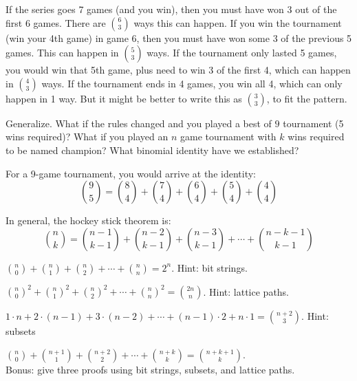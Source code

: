 \documentclass[11pt]{exam}
\def\d{\displaystyle}
\begin{document}
\begin{questions}
\begin{parts}
  \begin{solution}
	  If the series goes 7 games (and you win), then you must have won 3 out of the first 6 games.  There are $\d\binom{6}{3}$ ways this can happen.  If you win the tournament (win your 4th game) in game 6, then you must have won some 3 of the previous 5 games.  This can happen in ${5 \choose 3}$ ways.  If the tournament only lasted 5 games, you would win that 5th game, plus need to win 3 of the first 4, which can happen in ${4 \choose 3}$ ways.  If the tournament ends in 4 games, you win all 4, which can only happen in 1 way.  But it might be better to write this as ${3 \choose 3}$, to fit the pattern.
  \end{solution}
  \vfill
  \vfill
  \vfill
\end{parts}
\question Generalize.  What if the rules changed and you played a best of $9$ tournament (5 wins required)?  What if you played an $n$ game tournament with $k$ wins required to be named champion?  What binomial identity have we established?
\begin{solution}
For a 9-game tournament, you would arrive at the identity:
\[{9 \choose 5} = {8 \choose 4} + {7 \choose 4} + {6 \choose 4} + {5 \choose 4} + {4\choose 4}\]

In general, the hockey stick theorem is:
\[{n \choose k} = {n-1 \choose k-1} + {n-2 \choose k-1} + {n-3 \choose k-1} + \cdots + {n-k-1 \choose k-1}\]

\end{solution}
\vfill
\vfill





\clearpage



  \question $\d \binom{n}{0} + \binom{n}{1} + \binom{n}{2} + \cdots + \binom{n}{n} = 2^n$.  Hint: bit strings.
  \vfill

  \question $\d\binom{n}{0}^2 + \binom{n}{1}^2 + \binom{n}{2}^2 + \cdots + \binom{n}{n}^2 = \binom{2n}{n}$.  Hint: lattice paths.
  \vfill

  \question $\d 1 \cdot n + 2 \cdot (n-1) + 3\cdot (n-2)+ \cdots + (n-1)\cdot 2 + n\cdot 1 = \binom{n+2}{3}$.  Hint: subsets
  \vfill

  \question $\d \binom{n}{0} + \binom{n+1}{1} + \binom{n+2}{2} + \cdots + \binom{n+k}{k} = \binom{n+k+1}{k}$.  \\Bonus: give three proofs using bit strings, subsets, and lattice paths.
  \vfill

\end{questions}
\end{document}
